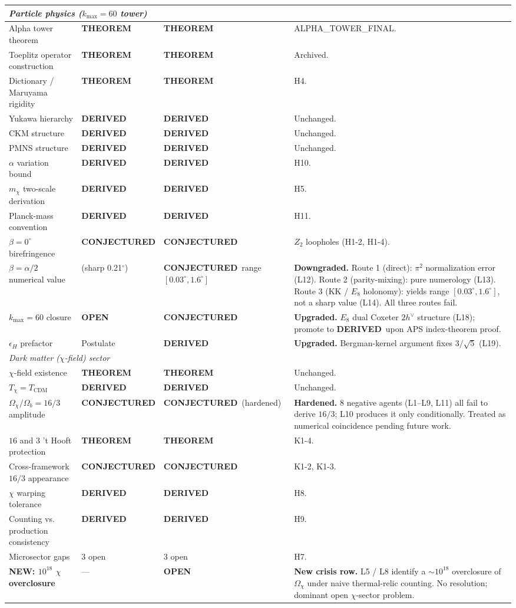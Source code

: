 \documentclass[11pt]{article}
\newcommand{\THM}{\textcolor{thmcol}{\textbf{THEOREM}}}
\newcommand{\DER}{\textcolor{dercol}{\textbf{DERIVED}}}
\newcommand{\CNJ}{\textcolor{conjcol}{\textbf{CONJECTURED}}}
\newcommand{\OPN}{\textcolor{opencol}{\textbf{OPEN}}}
\begin{document}
\begin{longtable}{p{} p{} p{} p{}}
\multicolumn{4}{l}{\textit{Particle physics ($k_{\max}=60$ tower)}} \\
\midrule
Alpha tower theorem & \THM & \THM & ALPHA\_TOWER\_FINAL. \\
Toeplitz operator construction & \THM & \THM & Archived. \\
Dictionary / Maruyama rigidity & \THM & \THM & H4. \\
Yukawa hierarchy & \DER & \DER & Unchanged. \\
CKM structure & \DER & \DER & Unchanged. \\
PMNS structure & \DER & \DER & Unchanged. \\
$\alpha$ variation bound & \DER & \DER & H10. \\
$m_\chi$ two-scale derivation & \DER & \DER & H5. \\
Planck-mass convention & \DER & \DER & H11. \\
$\beta=0^\circ$ birefringence & \CNJ & \CNJ & $Z_2$ loopholes (H1-2, H1-4). \\
$\beta = \alpha/2$ numerical value & (sharp 0.21$^\circ$) & \CNJ\ range $[0.03^\circ,1.6^\circ]$ & \textbf{Downgraded.} Route 1 (direct): $\pi^2$ normalization error (L12). Route 2 (parity-mixing): pure numerology (L13). Route 3 (KK / $E_8$ holonomy): yields range $[0.03^\circ, 1.6^\circ]$, not a sharp value (L14). All three routes fail. \\
$k_{\max}=60$ closure & \OPN & \CNJ & \textbf{Upgraded.} $E_8$ dual Coxeter $2h^\vee$ structure (L18); promote to \DER\ upon APS index-theorem proof. \\
$\epsilon_H$ prefactor & Postulate & \DER & \textbf{Upgraded.} Bergman-kernel argument fixes $3/\sqrt{5}$ (L19). \\
\midrule

\multicolumn{4}{l}{\textit{Dark matter ($\chi$-field) sector}} \\
\midrule
$\chi$-field existence & \THM & \THM & Unchanged. \\
$T_\chi = T_\text{CDM}$ & \DER & \DER & Unchanged. \\
$\Omega_\chi / \Omega_b = 16/3$ amplitude & \CNJ & \CNJ\ (hardened) & \textbf{Hardened.} 8 negative agents (L1--L9, L11) all fail to derive $16/3$; L10 produces it only conditionally. Treated as numerical coincidence pending future work. \\
$16$ and $3$ 't Hooft protection & \THM & \THM & K1-4. \\
Cross-framework $16/3$ appearance & \CNJ & \CNJ & K1-2, K1-3. \\
$\chi$ warping tolerance & \DER & \DER & H8. \\
Counting vs. production consistency & \DER & \DER & H9. \\
Microsector gaps & 3 open & 3 open & H7. \\
\textbf{NEW: $10^{18}$ $\chi$ overclosure} & --- & \OPN & \textbf{New crisis row.} L5 / L8 identify a $\sim 10^{18}$ overclosure of $\Omega_\chi$ under naive thermal-relic counting. No resolution; dominant open $\chi$-sector problem. \\
\midrule


\end{longtable}
\end{document}
